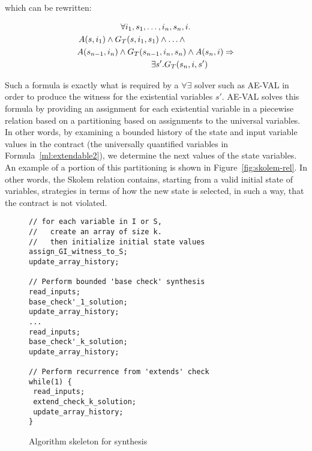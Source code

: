 which can be rewritten:

	\begin{multline}
	\label{ml:extendable2}
		\forall i_1,s_1,\ldots,i_n,s_n,i. \\
		\hspace{-2cm} A(s,i_1) \wedge G_T(s,i_1,s_1) \wedge \ldots \wedge \\
		A(s_{n-1}, i_n) \wedge G_T(s_{n-1},i_n,s_n) \wedge A(s_n,i) \Rightarrow \\
		\hspace{+2cm} \exists s'. G_T(s_n,i,s')
	\end{multline}



\noindent Such a formula is exactly what is required by a $\forall\exists$
solver such as AE-VAL in order to produce the witness for the existential variables $s'$.
%
AE-VAL solves this formula by providing an assignment for each existential variable in a piecewise relation based on a partitioning based on assignments to the universal variables.  In other words, by examining a bounded history of the state and input variable values in the contract (the universally quantified variables in Formula~\ref{ml:extendable2}), we determine the next values of the state variables.  An example of a portion of this partitioning is shown in Figure~\ref{fig:skolem-rel}.
In other words, the Skolem relation contains, starting from a valid
initial state of variables, strategies in terms of how the new state is
selected, in such a way, that the contract is not violated.
\iffalse
This is particularly
interesting in our case since in the underlying machinery, each contract is
translated into an equivalent program in the Lustre specification language,
which explicitly defines expressions that dictate the way in which each variable
is expected to behave after a transition occurs to a new state. Therefore, a
final implementation is a simple Lustre program that--apart from the initial
state definitions--contains a set of expressions that depict the behaviour of
each variable under a certain condition, in an equivalent manner to that
indicated by the Skolem relation.
\fi

\begin{figure}
\label{fig:algorithm}
\begin{small}
\begin{verbatim}
// for each variable in I or S,
//   create an array of size k.
//   then initialize initial state values
assign_GI_witness_to_S;
update_array_history;

// Perform bounded 'base check' synthesis
read_inputs;
base_check'_1_solution;
update_array_history;
...
read_inputs;
base_check'_k_solution;
update_array_history;

// Perform recurrence from 'extends' check
while(1) {
 read_inputs;
 extend_check_k_solution;
 update_array_history;
}
\end{verbatim}
\end{small}
\caption{Algorithm skeleton for synthesis}
\end{figure}

